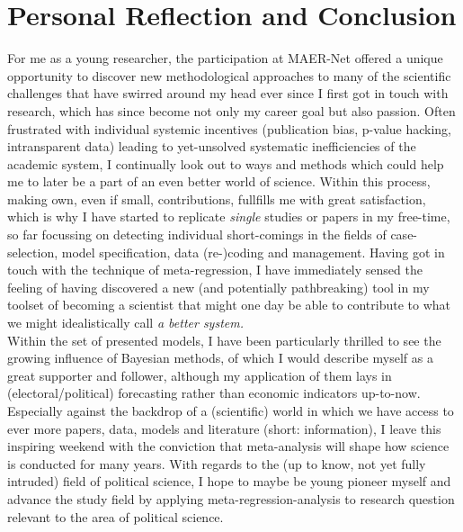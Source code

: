 \documentclass[a4paper,man,natbib]{apa6}
\begin{document}
\newpage
\section{Personal Reflection and Conclusion}

For me as a young researcher, the participation at MAER-Net offered a unique opportunity to discover new methodological approaches to many of the scientific challenges that have swirred around my head ever since I first got in touch with research, which has since become not only my career goal but also passion.
\newline
Often frustrated with individual systemic incentives (publication bias, p-value hacking, intransparent data) leading to yet-unsolved systematic inefficiencies of the academic system, I continually look out to ways and methods which could help me to later be a part of an even better world of science. Within this process, making own, even if small, contributions, fullfills me with great satisfaction, which is why I have started to replicate \textit{single} studies or papers in my free-time, so far focussing on detecting individual short-comings in the fields of case-selection, model specification, data (re-)coding and management. 
\newline
Having got in touch with the technique of meta-regression, I have immediately sensed the feeling of having discovered a new (and potentially pathbreaking) tool in my toolset of becoming a scientist that might one day be able to contribute to what we might idealistically call \textit{a better system.}\\
Within the set of presented models, I have been particularly thrilled to see the growing influence of Bayesian methods, of which I would describe myself as a great supporter and follower, although my application of them lays in (electoral/political) forecasting rather than economic indicators up-to-now. 
\newline
Especially against the backdrop of a (scientific) world in which we have access to ever more papers, data, models and literature (short: information), I leave this inspiring weekend with the conviction that meta-analysis will shape how science is conducted for many years. With regards to the (up to know, not yet fully intruded) field of political science, I hope to maybe be young pioneer myself and advance the study field by applying meta-regression-analysis to research question relevant to the area of political science. 


\nocite{*}

\end{document}
